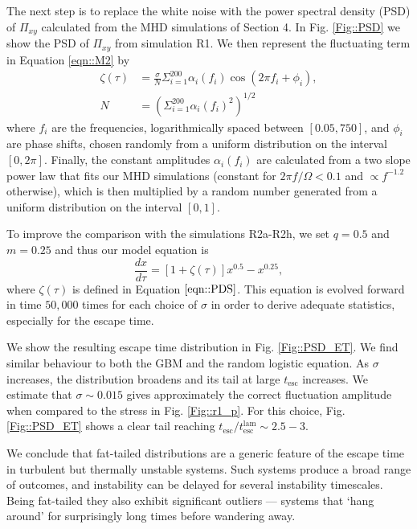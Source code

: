 \documentclass[useAMS]{mn2e}
\begin{document}
The next step is to replace the white noise with the power spectral
density (PSD) of $\Pi_{xy}$ calculated from the MHD simulations of
Section 4. 
In Fig. \ref{Fig::PSD} we show the PSD of $\Pi_{xy}$ from
simulation R1. We then represent
the fluctuating term in Equation \eqref{eqn::M2} by
 \begin{align}
\zeta(\tau)&=\frac{\sigma}{N}\Sigma_{i=1}^{200} \alpha_{i}(f_{i}) \cos\left( 2\pi f_{i}+\phi_{i}\right),\label{eqn::PDS} \\
N&=\left(\Sigma_{i=1}^{200}\alpha_{i}(f_{i})^{2}\right)^{1/2}
\end{align} 
where $f_{i}$ are the frequencies, logarithmically spaced between $\left[0.05,
 750\right]$, and $\phi_{i}$ are phase shifts, chosen randomly
from a 
uniform distribution on the interval $\left[0, 2\pi\right]$. 
Finally, the constant amplitudes $\alpha_{i}(f_{i})$ are
calculated from a two slope power law that fits our
MHD simulations (constant for $2\pi f/\Omega<0.1$ and $\propto
f^{-1.2}$ otherwise), which is then multiplied by a random number
generated from a uniform distribution on the interval $[0,1]$. 


To improve the comparison with the simulations R2a-R2h, we set $q=0.5$
and $m=0.25$ 
and thus our model equation is
\begin{equation}
\frac{dx}{d\tau}=\left[1+\zeta(\tau)\right]x^{0.5}-x^{0.25},
\label{eqn::M2l}
\end{equation}
where $\zeta(\tau)$ is defined in Equation $\eqref{eqn::PDS}$. This
equation is evolved forward in time $50,000$ times for each choice of $\sigma$
in order to derive adequate statistics, especially for the escape time.


We show the resulting escape time distribution in 
Fig. \ref{Fig::PSD_ET}. We find similar behaviour to both
the GBM and the random logistic equation. As $\sigma$ increases, the
distribution broadens and its tail at large $t_{\text{esc}}$
increases. We estimate that $\sigma\sim0.015$ gives approximately the
correct fluctuation amplitude when compared to the stress in
Fig. \ref{Fig::r1_p}. For this choice,  Fig. \ref{Fig::PSD_ET} 
shows a clear tail reaching $t_{\text{esc}}/t_{\text{esc}}^{\text{lam}}\sim2.5-3$.

We
conclude that fat-tailed distributions are a generic feature of the
escape time in turbulent but thermally unstable systems. Such systems
produce a broad range of outcomes, and instability can be delayed for
several instability timescales. Being fat-tailed they also exhibit
significant outliers --- systems that `hang around' for surprisingly
long times before wandering away. 
\end{document}
